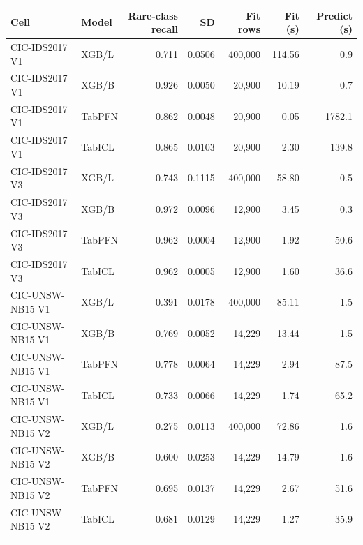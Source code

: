 \begin{tabular}{@{}llrrrrr@{}}
\toprule
Cell & Model & Rare-class recall & SD & Fit rows & Fit (s) & Predict (s) \\
\midrule
CIC-IDS2017 V1 & XGB/L & 0.711 & 0.0506 & 400,000 & 114.56 & 0.9 \\
CIC-IDS2017 V1 & XGB/B & 0.926 & 0.0050 & 20,900 & 10.19 & 0.7 \\
CIC-IDS2017 V1 & TabPFN & 0.862 & 0.0048 & 20,900 & 0.05 & 1782.1 \\
CIC-IDS2017 V1 & TabICL & 0.865 & 0.0103 & 20,900 & 2.30 & 139.8 \\
\addlinespace
CIC-IDS2017 V3 & XGB/L & 0.743 & 0.1115 & 400,000 & 58.80 & 0.5 \\
CIC-IDS2017 V3 & XGB/B & 0.972 & 0.0096 & 12,900 & 3.45 & 0.3 \\
CIC-IDS2017 V3 & TabPFN & 0.962 & 0.0004 & 12,900 & 1.92 & 50.6 \\
CIC-IDS2017 V3 & TabICL & 0.962 & 0.0005 & 12,900 & 1.60 & 36.6 \\
\addlinespace
CIC-UNSW-NB15 V1 & XGB/L & 0.391 & 0.0178 & 400,000 & 85.11 & 1.5 \\
CIC-UNSW-NB15 V1 & XGB/B & 0.769 & 0.0052 & 14,229 & 13.44 & 1.5 \\
CIC-UNSW-NB15 V1 & TabPFN & 0.778 & 0.0064 & 14,229 & 2.94 & 87.5 \\
CIC-UNSW-NB15 V1 & TabICL & 0.733 & 0.0066 & 14,229 & 1.74 & 65.2 \\
\addlinespace
CIC-UNSW-NB15 V2 & XGB/L & 0.275 & 0.0113 & 400,000 & 72.86 & 1.6 \\
CIC-UNSW-NB15 V2 & XGB/B & 0.600 & 0.0253 & 14,229 & 14.79 & 1.6 \\
CIC-UNSW-NB15 V2 & TabPFN & 0.695 & 0.0137 & 14,229 & 2.67 & 51.6 \\
CIC-UNSW-NB15 V2 & TabICL & 0.681 & 0.0129 & 14,229 & 1.27 & 35.9 \\
\addlinespace
\bottomrule
\end{tabular}